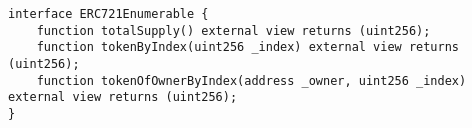 \begin{lstlisting}[language=Solidity]
interface ERC721Enumerable {
    function totalSupply() external view returns (uint256);
    function tokenByIndex(uint256 _index) external view returns (uint256);
    function tokenOfOwnerByIndex(address _owner, uint256 _index) external view returns (uint256);
}
\end{lstlisting}